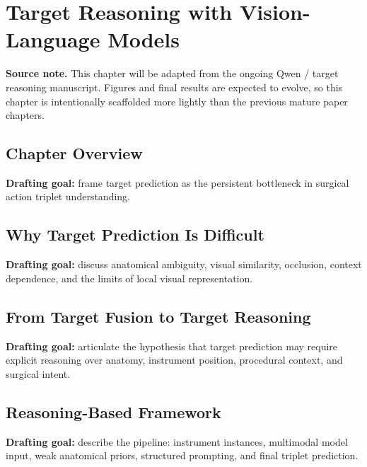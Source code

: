 \chapter{Target Reasoning with Vision-Language Models}
\label{chap:target-reasoning}
\minitoc

\begin{center}
\begin{minipage}[b]{0.9\linewidth}
\small
\textbf{Source note.}
This chapter will be adapted from the ongoing Qwen / target reasoning manuscript. Figures and final results are expected to evolve, so this chapter is intentionally scaffolded more lightly than the previous mature paper chapters.
\end{minipage}
\end{center}

\section{Chapter Overview}
\label{sec:target-reasoning-overview}

\textbf{Drafting goal:} frame target prediction as the persistent bottleneck in surgical action triplet understanding.

\section{Why Target Prediction Is Difficult}
\label{sec:target-reasoning-difficulty}

\textbf{Drafting goal:} discuss anatomical ambiguity, visual similarity, occlusion, context dependence, and the limits of local visual representation.

\section{From Target Fusion to Target Reasoning}
\label{sec:target-reasoning-hypothesis}

\textbf{Drafting goal:} articulate the hypothesis that target prediction may require explicit reasoning over anatomy, instrument position, procedural context, and surgical intent.

\section{Reasoning-Based Framework}
\label{sec:target-reasoning-framework}

\textbf{Drafting goal:} describe the pipeline: instrument instances, multimodal model input, weak anatomical priors, structured prompting, and final triplet prediction.

